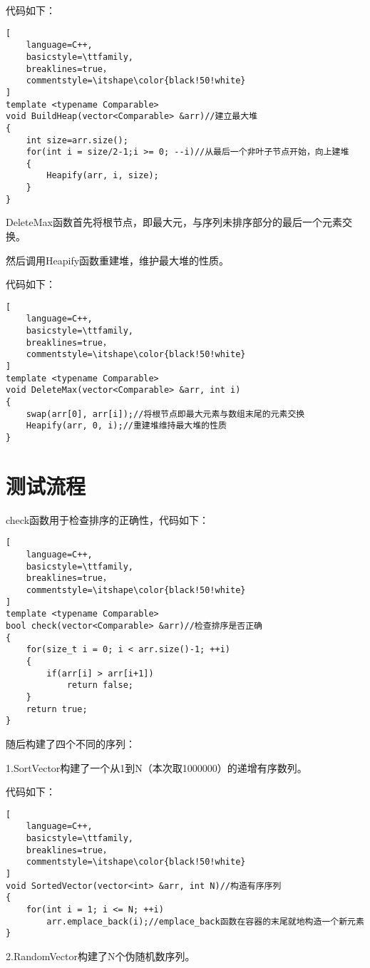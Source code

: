 \documentclass[UTF8]{ctexart}
\begin{document}
代码如下：

\begin{lstlisting}[
    language=C++,
    basicstyle=\ttfamily,
    breaklines=true，
    commentstyle=\itshape\color{black!50!white}
]
template <typename Comparable>
void BuildHeap(vector<Comparable> &arr)//建立最大堆
{
    int size=arr.size();
    for(int i = size/2-1;i >= 0; --i)//从最后一个非叶子节点开始，向上建堆
    {
        Heapify(arr, i, size);
    }
}
\end{lstlisting}
DeleteMax函数首先将根节点，即最大元，与序列未排序部分的最后一个元素交换。

然后调用Heapify函数重建堆，维护最大堆的性质。

代码如下：

\begin{lstlisting}[
    language=C++,
    basicstyle=\ttfamily,
    breaklines=true，
    commentstyle=\itshape\color{black!50!white}
]
template <typename Comparable>
void DeleteMax(vector<Comparable> &arr, int i)
{
    swap(arr[0], arr[i]);//将根节点即最大元素与数组末尾的元素交换
    Heapify(arr, 0, i);//重建堆维持最大堆的性质
}
\end{lstlisting}


\section{测试流程}
check函数用于检查排序的正确性，代码如下：
\begin{lstlisting}[
    language=C++,
    basicstyle=\ttfamily,
    breaklines=true，
    commentstyle=\itshape\color{black!50!white}
]
template <typename Comparable>
bool check(vector<Comparable> &arr)//检查排序是否正确
{
    for(size_t i = 0; i < arr.size()-1; ++i)
    {
        if(arr[i] > arr[i+1])
            return false;
    }
    return true;
}
\end{lstlisting}
随后构建了四个不同的序列：

1.SortVector构建了一个从1到N（本次取1000000）的递增有序数列。

代码如下：

\begin{lstlisting}[
    language=C++,
    basicstyle=\ttfamily,
    breaklines=true，
    commentstyle=\itshape\color{black!50!white}
]
void SortedVector(vector<int> &arr, int N)//构造有序序列
{
    for(int i = 1; i <= N; ++i)
        arr.emplace_back(i);//emplace_back函数在容器的末尾就地构造一个新元素
}
\end{lstlisting}

2.RandomVector构建了N个伪随机数序列。
\end{document}

